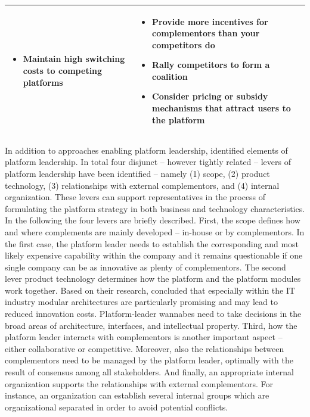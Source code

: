 \begin{table}[t]
\begin{tabular}{L{.45\textwidth}L{.45\textwidth}}
\begin{itemize}[leftmargin=*, parsep=0pt, topsep=0pt, itemsep=0pt]
				\item Maintain high switching costs to competing platforms	\vspace{-\baselineskip} 
			\end{itemize} &
			\vspace{-4mm}
			\footnotesize
			\begin{itemize}[leftmargin=*, parsep=0pt, topsep=0pt, itemsep=0pt]
				\item Provide more incentives for complementors than your competitors do
				\item Rally competitors to form a coalition
				\item Consider pricing or subsidy mechanisms that attract users to the platform \vspace{-\baselineskip} 
			\end{itemize} \\ \bottomrule
	\end{tabular}
\end{table}

In addition to approaches enabling platform leadership, \citet{Cusumano2002} identified elements of platform leadership. In total four disjunct -- however tightly related -- levers of platform leadership have been identified -- namely (1) scope, (2) product technology, (3) relationships with external complementors, and (4) internal organization. These levers can support representatives in the process of formulating the platform strategy in both business and technology characteristics. In the following the four levers are briefly described. First, the scope defines how and where complements are mainly developed -- in-house or by complementors. In the first case, the platform leader needs to establish the corresponding and most likely expensive capability within the company and it remains questionable if one single company can be as innovative as plenty of complementors. The second lever product technology determines how the platform and the platform modules work together. Based on their research, \citet[pp. 55-56]{Cusumano2002} concluded that especially within the \ac{IT} industry modular architectures are particularly promising and may lead to reduced innovation costs. Platform-leader wannabes need to take decisions in the broad areas of architecture, interfaces, and intellectual property. Third, how the platform leader interacts with complementors is another important aspect -- either collaborative or competitive. Moreover, also the relationships between complementors need to be managed by the platform leader, optimally with the result of consensus among all stakeholders. And finally, an appropriate internal organization supports the relationships with external complementors. For instance, an organization can establish several internal groups which are organizational separated in order to avoid potential conflicts.

